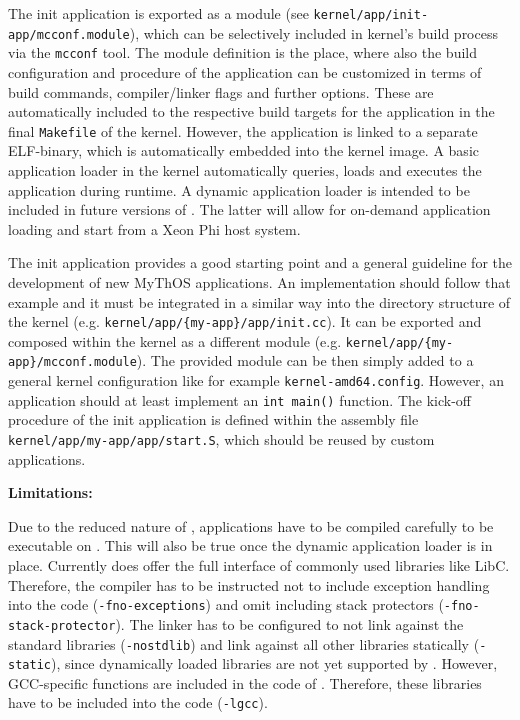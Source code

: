 The init application is exported as a module (see
\texttt{kernel/app/init-app/mcconf.module}), which can be selectively included
in kernel's build process via the \texttt{mcconf} tool. The module definition is
the place, where also the build configuration and procedure of the application
can be customized in terms of build commands, compiler/linker flags and further
options. These are automatically included to the respective build targets for
the application in the final \texttt{Makefile} of the kernel. However, the
application is linked to a separate ELF-binary, which is automatically embedded
into the kernel image. A basic application loader in the kernel automatically
queries, loads and executes the application during runtime.
A dynamic application loader is intended to be included in future versions of
\mythos. The latter will allow for on-demand application loading and start from
a Xeon Phi host system.

The init application provides a good starting point and a general guideline for
the development of new MyThOS applications. An implementation should follow that
example and it must be integrated in a similar way into the directory structure
of the kernel (e.g. \texttt{kernel/app/\{my-app\}/app/init.cc}). It can be
exported and composed within the kernel as a different module (e.g.
\texttt{kernel/app/\{my-app\}/mcconf.module}). The provided module can be then
simply added to a general kernel configuration like for example
\texttt{kernel-amd64.config}. However, an application should at least implement
an \texttt{int main()} function. The kick-off procedure of the init application
is defined within the assembly file \texttt{kernel/app/{my-app}/app/start.S},
which should be reused by custom applications.

\noindent\textbf{Limitations:}

Due to  the reduced nature of \mythos, applications have to be compiled
carefully to be executable on \mythos. This will also be true once the dynamic
application loader is in place. Currently \mythos does offer the full interface
of commonly used libraries like LibC. Therefore, the compiler has to be
instructed not to include exception handling into the code
(\texttt{-fno-exceptions}) and omit including stack protectors
(\texttt{-fno-stack-protector}). The linker has to be configured to not link
against the standard libraries (\texttt{-nostdlib}) and link against all other
libraries statically (\texttt{-static}), since dynamically loaded libraries are
not yet supported by \mythos. However, GCC-specific functions are included in
the code of \mythos. Therefore, these libraries have to be included into the
code (\texttt{-lgcc}).

